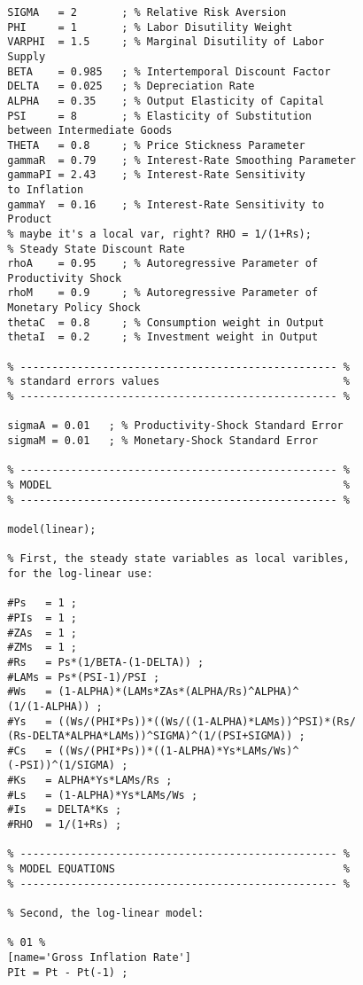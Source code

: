 \documentclass[../thesis.tex]{subfiles}
\begin{document}
{\begin{verbatim}
		SIGMA   = 2       ; % Relative Risk Aversion
		PHI     = 1       ; % Labor Disutility Weight
		VARPHI  = 1.5     ; % Marginal Disutility of Labor 
		Supply
		BETA    = 0.985   ; % Intertemporal Discount Factor
		DELTA   = 0.025   ; % Depreciation Rate
		ALPHA   = 0.35    ; % Output Elasticity of Capital
		PSI     = 8       ; % Elasticity of Substitution 
		between Intermediate Goods
		THETA   = 0.8     ; % Price Stickness Parameter
		gammaR  = 0.79    ; % Interest-Rate Smoothing Parameter
		gammaPI = 2.43    ; % Interest-Rate Sensitivity 
		to Inflation
		gammaY  = 0.16    ; % Interest-Rate Sensitivity to 
		Product
		% maybe it's a local var, right? RHO = 1/(1+Rs); 
		% Steady State Discount Rate
		rhoA    = 0.95    ; % Autoregressive Parameter of 
		Productivity Shock
		rhoM    = 0.9     ; % Autoregressive Parameter of 
		Monetary Policy Shock
		thetaC  = 0.8     ; % Consumption weight in Output
		thetaI  = 0.2     ; % Investment weight in Output
		
		% -------------------------------------------------- % 
		% standard errors values                             %
		% -------------------------------------------------- %
		
		sigmaA = 0.01   ; % Productivity-Shock Standard Error
		sigmaM = 0.01   ; % Monetary-Shock Standard Error
		
		% -------------------------------------------------- %
		% MODEL                                              %
		% -------------------------------------------------- %
		
		model(linear);
		
		% First, the steady state variables as local varibles, 
		for the log-linear use:
		
		#Ps   = 1 ;
		#PIs  = 1 ;
		#ZAs  = 1 ;
		#ZMs  = 1 ;
		#Rs   = Ps*(1/BETA-(1-DELTA)) ;
		#LAMs = Ps*(PSI-1)/PSI ;
		#Ws   = (1-ALPHA)*(LAMs*ZAs*(ALPHA/Rs)^ALPHA)^
		(1/(1-ALPHA)) ;
		#Ys   = ((Ws/(PHI*Ps))*((Ws/((1-ALPHA)*LAMs))^PSI)*(Rs/
		(Rs-DELTA*ALPHA*LAMs))^SIGMA)^(1/(PSI+SIGMA)) ;
		#Cs   = ((Ws/(PHI*Ps))*((1-ALPHA)*Ys*LAMs/Ws)^
		(-PSI))^(1/SIGMA) ;
		#Ks   = ALPHA*Ys*LAMs/Rs ;
		#Ls   = (1-ALPHA)*Ys*LAMs/Ws ;
		#Is   = DELTA*Ks ;
		#RHO  = 1/(1+Rs) ;
		
		% -------------------------------------------------- % 
		% MODEL EQUATIONS                                    %
		% -------------------------------------------------- %
		
		% Second, the log-linear model:
		
		% 01 %
		[name='Gross Inflation Rate']
		PIt = Pt - Pt(-1) ;
		

\end{verbatim}}
\end{document}
